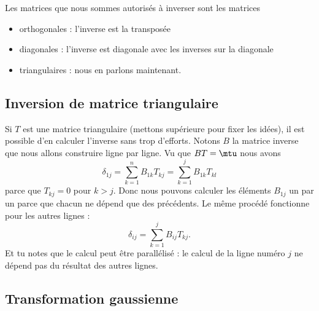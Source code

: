 Les matrices que nous sommes autorisés à inverser sont les matrices
\begin{itemize}
	\item orthogonales : l'inverse est la transposée
	\item diagonales : l'inverse est diagonale avec les inverses sur la diagonale
	\item triangulaires : nous en parlons maintenant.
\end{itemize}

\subsection{Inversion de matrice triangulaire}

Si \( T\) est une matrice triangulaire (mettons supérieure pour fixer les idées), il est possible d'en calculer l'inverse sans trop d'efforts. Notons \( B\) la matrice inverse que nous allons construire ligne par ligne. Vu que \( BT=\mtu\) nous avons
\begin{equation}
	\delta_{1j}=\sum_{k=1}^nB_{1k}T_{kj}=\sum_{k=1}^jB_{1k}T_{kl}
\end{equation}
parce que \( T_{kj}=0\) pour \( k>j\). Donc nous pouvons calculer les éléments \( B_{1j} \) un par un parce que chacun ne dépend que des précédents. Le même procédé fonctionne pour les autres lignes :
\begin{equation}
	\delta_{ij}=\sum_{k=1}^jB_{ij}T_{kj}.
\end{equation}
Et tu notes que le calcul peut être parallélisé : le calcul de la ligne numéro \( j\) ne dépend pas du résultat des autres lignes.

\subsection{Transformation gaussienne}

